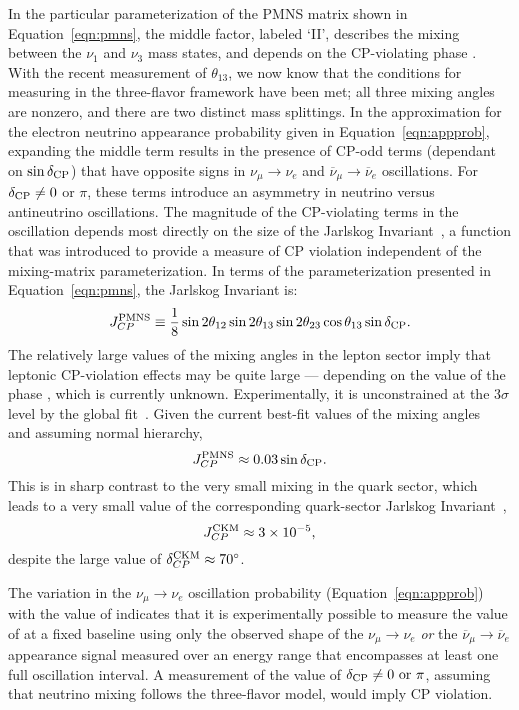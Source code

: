 In the particular parameterization of the PMNS matrix shown in
Equation~\ref{eqn:pmns}, the middle factor, labeled `II', describes
the mixing between the $\nu_1$ and $\nu_3$ mass states, and depends on
the CP-violating phase \deltacp.  With the recent measurement of $\theta_{13}$, we now know
that the conditions for measuring \deltacp in the three-flavor framework 
have been met; all three mixing angles are nonzero, and there are two distinct mass splittings.
In the approximation for the electron neutrino appearance probability given in Equation~\ref{eqn:appprob}, 
expanding the middle term results in the presence of CP-odd terms (dependant on $\sin \mdeltacp$) that have opposite signs 
in $\nu_{\mu} \rightarrow \nu_e$ and $\overline{\nu}_{\mu} \rightarrow \overline{\nu}_e$ oscillations.
For $\mdeltacp \neq 0$ or $\pi$, these terms introduce an
asymmetry in neutrino versus antineutrino oscillations. The magnitude of the
CP-violating terms in the oscillation depends most directly on the size of 
the Jarlskog Invariant~\cite{Jarlskog:1985cw}, a function that was
introduced to provide a measure of CP violation independent of the 
mixing-matrix parameterization. In terms of the parameterization presented in Equation~\ref{eqn:pmns},
the Jarlskog Invariant is:
%
\begin{equation}
J_{CP}^{\rm PMNS} \equiv \frac{1}{8} \sin 2 \theta_{12} \sin 2 \theta_{13}
\sin 2 \theta_{23} \cos \theta_{13} \sin \mdeltacp.
\end{equation}
The relatively large values of the mixing angles in the lepton sector imply that
leptonic CP-violation effects may be quite large ---  
depending on the value of the phase \deltacp, which is currently unknown. 
Experimentally, it is unconstrained at the 3$\sigma$ level by the global fit~\cite{Gonzalez-Garcia:2014bfa}.
Given the current best-fit values of the mixing angles~\cite{Gonzalez-Garcia:2014bfa} and assuming normal hierarchy,
\begin{equation}
J_{CP}^{\rm PMNS} \approx 0.03 \sin \mdeltacp.
\end{equation}
This is in sharp contrast to the very small mixing in the quark sector,  
which leads to a very small value of the corresponding quark-sector
Jarlskog Invariant~\cite{Beringer:1900zz},
\begin{equation}
J_{CP}^{\rm CKM} \approx 3 \times 10^{-5},
\end{equation}
despite the large value of $\delta^{\rm CKM}_{CP}\approx70^{\circ}$.

The variation in the $\nu_\mu \rightarrow
\nu_e$ oscillation probability (Equation~\ref{eqn:appprob}) with the value of \deltacp
indicates that it is experimentally possible to measure the value of
\deltacp at a fixed baseline using only the observed shape of the
$\nu_\mu \rightarrow \nu_e$ {\em or} the 
$\overline{\nu}_\mu \rightarrow \overline{\nu}_e$
appearance signal measured over an energy range that encompasses at
least one full oscillation interval. A measurement of the value of
$\mdeltacp \neq 0 \ {\rm or} \ \pi$, assuming that neutrino mixing follows the three-flavor model, would imply CP violation.  

